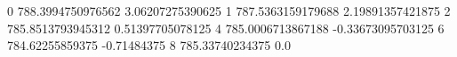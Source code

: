0 788.3994750976562 3.06207275390625
1 787.5363159179688 2.19891357421875
2 785.8513793945312 0.51397705078125
4 785.0006713867188 -0.33673095703125
6 784.62255859375 -0.71484375
8 785.33740234375 0.0
